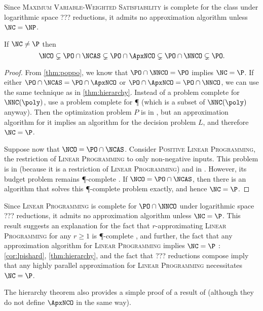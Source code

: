 \documentclass[]{article}
\begin{document}
Since \textsc{Maximum Variable-Weighted Satisfiability} is complete for the class \NNCO{} under logarithmic space ??? reductions, it admits no \NC{} approximation algorithm unless $\NC = \NP$.

\begin{theorem}\label{thm:hierarchy2}
  If $\NC \neq \P$ then
  \begin{equation*}
    \NCO \subsetneq \PO \cap \NCAS \subsetneq \PO \cap \ApxNCO \subsetneq \PO \cap \NNCO \subsetneq \PO.
  \end{equation*}
\end{theorem}
\begin{proof}
  From \autoref{thm:poppo}, we know that $\PO \cap \NNCO = \PO$ implies $\NC = \P$.
  If either $\PO \cap \NCAS = \PO \cap \ApxNCO$ or $\PO \cap \ApxNCO = \PO \cap \NNCO$, we can use the same technique as in \autoref{thm:hierarchy}.
  Instead of a problem complete for $\NNC(\poly)$, use a problem complete for \P{} (which is a subset of $\NNC(\poly)$ anyway).
  Then the optimization problem $P$ is in \PO, but an \NC{} approximation algorithm for it implies an \NC{} algorithm for the decision problem $L$, and therefore $\NC = \P$.

  Suppose now that $\NCO = \PO \cap \NCAS$.
  Consider \textsc{Positive Linear Programming}, the restriction of \textsc{Linear Programming} to only non-negative inputs.
  This problem is in \PO{} (because it is a restriction of \textsc{Linear Programming}) and in \NCAS{} \cite{ln93}.
  However, its budget problem remains \P-complete \cite{tx98}.
  If $\NCO = \PO \cap \NCAS$, then there is an \NC{} algorithm that solves this \P-complete problem exactly, and hence $\NC = \P$.
\end{proof}

Since \textsc{Linear Programming} is complete for $\PO \cap \NNCO$ under logarithmic space ??? reductions, it admits no \NC{} approximation algorithm unless $\NC = \P$.
This result suggests an explanation for the fact that $r$-approximating \textsc{Linear Programming} for any $r \geq 1$ is \P-complete \cite[Theorem~8.2.7]{dsst97}, and further, the fact that any \NC{} approximation algorithm for \textsc{Linear Programming} implies $\NC = \P$ \cite[Theorem~8.2.8]{dsst97}: \autoref{cor:lpishard}, \autoref{thm:hierarchy}, and the fact that ??? reductions compose imply that any highly parallel approximation for \textsc{Linear Programming} necessitates $\NC = \P$.

The hierarchy theorem also provides a simple proof of a result of \cite{dsst97} (although they do not define $\ApxNCO$ in the same way).
\end{document}
